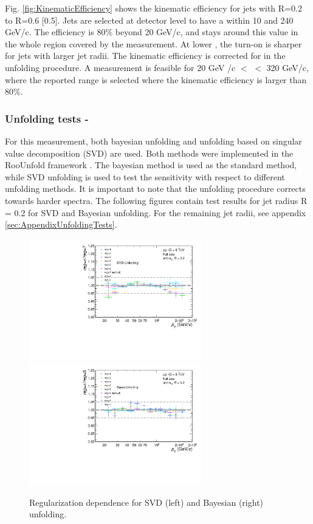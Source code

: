 Fig. \ref{fig:KinematicEfficiency} shows the kinematic efficiency for jets with R=0.2 to R=0.6 [0.5]. Jets are selected at detector level to have a \pT within 10 and 240 GeV/c. The efficiency is 80$\%$ beyond 20 GeV/c, and stays around this value in the whole region covered by the measurement. At lower \pT, the turn-on is sharper for jets with larger jet radii. The kinematic efficiency is corrected for in the unfolding procedure. A measurement is feasible for 20 GeV /c $<$ \pT $<$ 320 GeV/c, where the reported range is selected where the kinematic efficiency is larger than 80$\%$.

\subsubsection{Unfolding tests - \pp}
\label{subsec:unfoldingTests}

For this measurement, both bayesian unfolding and unfolding based on singular value decomposition (SVD) are used. Both methods were implemented in the RooUnfold framework \cite{roounfold}. The bayesian method is used as the standard method, while SVD unfolding is used to test the sensitivity with respect to different unfolding methods. It is important to note that the unfolding procedure corrects towards harder spectra. The following figures contain test results for jet radius R = 0.2 for SVD and Bayesian unfolding. For the remaining jet radii, see appendix \ref{sec:AppendixUnfoldingTests}.

\begin{figure}
    \centering
    \begin{multicols}{2}
            \includegraphics[width=7.5cm]{figures/UnfoldingComparisons/Regularizations/RatioRegularizationSvd_R02.pdf}
        \vfill\null 
        \columnbreak
            \includegraphics[width=7.5cm]{figures/UnfoldingComparisons/Regularizations/RatioRegularizationBayes_R02.pdf}
        \vfill\null
    \end{multicols}
    \caption{Regularization dependence for SVD (left) and Bayesian (right) unfolding.}
    \label{fig:RegIter}
\end{figure}


